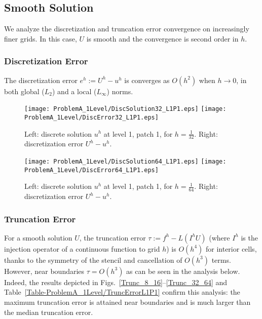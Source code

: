 \documentclass[12pt]{article}
\begin{document}
\newpage
\subsection{Smooth Solution}
We analyze the discretization and truncation error convergence on increasingly
finer grids. In this case, $U$ is smooth and the convergence is second
order in $h$.

\subsubsection{Discretization Error}
The discretization error $e^h := U^h-u^h$ is converges as $O(h^2)$ when
$h \rightarrow 0$, in both global ($L_2$) and a local ($L_{\infty}$) norms.

\begin{figure}[htbp]
\begin{center}
\texttt{[image: ProblemA\_1Level/DiscSolution32\_L1P1.eps]}
\texttt{[image: ProblemA\_1Level/DiscError32\_L1P1.eps]}
\end{center}
\caption{Left: discrete solution $u^h$ at level 1, patch 1, for
$h = \frac{1}{32}$. Right: discretization error $U^h-u^h$.}
\label{solution32}
\end{figure}  

\begin{figure}[htbp]
\begin{center}
\texttt{[image: ProblemA\_1Level/DiscSolution64\_L1P1.eps]}
\texttt{[image: ProblemA\_1Level/DiscError64\_L1P1.eps]}
\end{center}
\caption{Left: discrete solution $u^h$ at level 1, patch 1, for
$h = \frac{1}{64}$. Right: discretization error $U^h-u^h$.}
\label{solution64}
\end{figure}  



\subsubsection{Truncation Error}
For a smooth solution $U$, the truncation error $\tau := f^h - L(I^h U)$
(where $I^h$ is the injection operator of a continuous function to grid $h$)
is $O(h^4)$ for interior cells,
thanks to the symmetry of the stencil and cancellation of $O(h^3)$ terms.
However, near boundaries $\tau=O(h^3)$ as can be seen in the analysis below.
Indeed, the results depicted in Figs.~\ref{Trunc_8_16}--\ref{Trunc_32_64}
and Table~\ref{Table-ProblemA_1Level/TruncErrorL1P1} confirm this analysis:
the maximum truncation error is attained near boundaries and is much larger
than the median truncation error.
\end{document}
